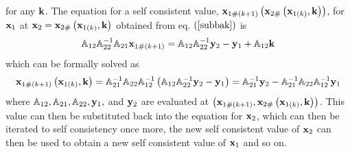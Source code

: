 for any ${\bf k}$. The equation for a self consistent value, ${\bf x}%
_{1\#\left( k+1\right) }\left( {\bf x}_{2\#}\left( {\bf x}_{1\left( k\right)
},{\bf k}\right) \right) $, for ${\bf x}_{1}$ at ${\bf x}_{2}={\bf x}%
_{2\#}\left( {\bf x}_{1\left( k\right) },{\bf k}\right) $ obtained from eq. $%
\left( \ref{subbak}\right) $ is%
\begin{equation}
{\Bbb A}_{12}{\Bbb A}_{22}^{-1}{\Bbb A}_{21}{\bf x}_{1\#\left( k+1\right) }=%
{\Bbb A}_{12}{\Bbb A}_{22}^{-1}{\bf y}_{2}-{\bf y}_{1}+{\Bbb A}_{12}{\bf k}
\label{scx1}
\end{equation}%
which can be formally solved as 
\begin{equation}
{\bf x}_{1\#\left( k+1\right) }\left( {\bf x}_{1\left( k\right) },{\bf k}%
\right) ={\Bbb A}_{21}^{-1}{\Bbb A}_{22}{\Bbb A}_{12}^{-1}\left( {\Bbb A}%
_{12}{\Bbb A}_{22}^{-1}{\bf y}_{2}-{\bf y}_{1}\right) ={\Bbb A}_{21}^{-1}%
{\bf y}_{2}-{\Bbb A}_{21}^{-1}{\Bbb A}_{22}{\Bbb A}_{12}^{-1}{\bf y}_{1}
\end{equation}%
where ${\Bbb A}_{12},{\Bbb A}_{21},{\Bbb A}_{22},{\bf y}_{1},$ and ${\bf y}%
_{2}$ are evaluated at $\left( {\bf x}_{1\#\left( k+1\right) },{\bf x}%
_{2\#}\left( {\bf x}_{1\left( k\right) },{\bf k}\right) \right) $. This
value can then be substituted back into the equation for ${\bf x}_{2}$,
which can then be iterated to self consistency once more, the new self
consistent value of ${\bf x}_{2}$ can then be used to obtain a new self
consistent value of ${\bf x}_{1}$ and so on.

